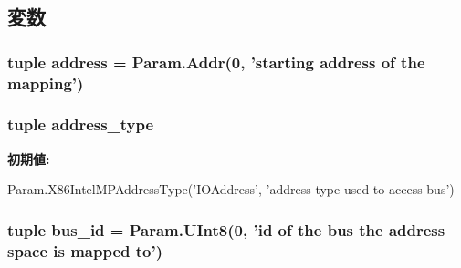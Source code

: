 \subsection{変数}
\hypertarget{classIntelMP_1_1X86IntelMPAddrSpaceMapping_a8c6c97c073c5563f4af9547714a7652c}{
\subsubsection[{address}]{\setlength{\rightskip}{0pt plus 5cm}tuple {\bf address} = {\bf Param.Addr}(0, 'starting {\bf address} of the mapping')}}
\label{classIntelMP_1_1X86IntelMPAddrSpaceMapping_a8c6c97c073c5563f4af9547714a7652c}
\hypertarget{classIntelMP_1_1X86IntelMPAddrSpaceMapping_af94a82286d50e2f918f75e168e7db106}{
\subsubsection[{address\_\-type}]{\setlength{\rightskip}{0pt plus 5cm}tuple {\bf address\_\-type}}}
\label{classIntelMP_1_1X86IntelMPAddrSpaceMapping_af94a82286d50e2f918f75e168e7db106}
{\bfseries 初期値:}
\begin{DoxyCode}
Param.X86IntelMPAddressType('IOAddress',
            'address type used to access bus')
\end{DoxyCode}
\hypertarget{classIntelMP_1_1X86IntelMPAddrSpaceMapping_a6e34d01145c4deea78b58e36f0a7e81b}{
\subsubsection[{bus\_\-id}]{\setlength{\rightskip}{0pt plus 5cm}tuple {\bf bus\_\-id} = Param.UInt8(0, 'id of the bus the {\bf address} space is mapped to')}}
